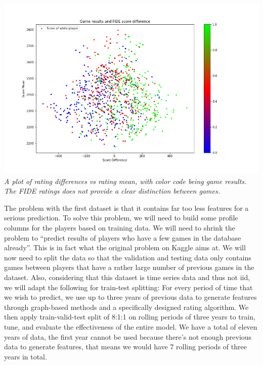 \documentclass[12pt, letterpaper]{article}
\begin{document}
\begin{multicols}{2}
\setlength{\parskip}{0.0cm}
\begin{center}
\begin{scriptsize}

\includegraphics[width=\linewidth]{../figures/FIDE_results.png}
\textit{A plot of rating differences vs rating mean, with color code being game results. The FIDE ratings does not provide a clear distinction between games.}

\end{scriptsize}
\end{center}
\setlength{\parskip}{0.1cm}

The problem with the first dataset is that it contains far too less features for a serious prediction. To solve this problem, we will need to build some profile columns for the players based on training data. We will need to shrink the problem to “predict results of players who have a few games in the database already”. This is in fact what the original problem on Kaggle aims at. We will now need to split the data so that the validation and testing data only contains games between players that have a rather large number of previous games in the dataset. Also, considering that this dataset is time series data and thus not iid, we will adapt the following for train-test splitting: For every period of time that we wish to predict, we use up to three years of previous data to generate features through graph-based methods and a specifically designed rating algorithm. We then apply train-valid-test split of 8:1:1 on rolling periods of three years to train, tune, and evaluate the effectiveness of the entire model. We have a total of eleven years of data, the first year cannot be used because there’s not enough previous data to generate features, that means we would have 7 rolling periods of three years in total.


\end{multicols}
\end{document}
